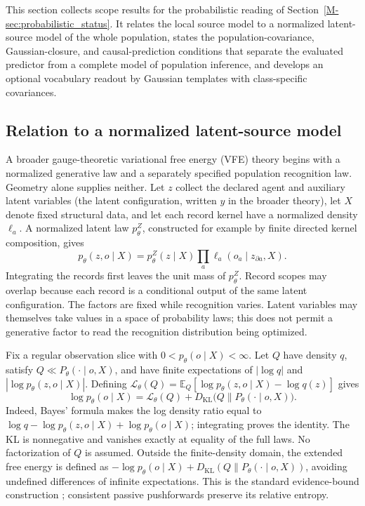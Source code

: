 \documentclass[twoside,11pt]{article}
\begin{document}
This section collects scope results for the probabilistic reading of Section~\ref{M-sec:probabilistic_status}. It relates the local source model to a normalized latent-source model of the whole population, states the population-covariance, Gaussian-closure, and causal-prediction conditions that separate the evaluated predictor from a complete model of population inference, and develops an optional vocabulary readout by Gaussian templates with class-specific covariances.

\subsection{Relation to a normalized latent-source model}
\label{app:fixed_joint_bridge}

A broader gauge-theoretic variational free energy (VFE) theory begins with a normalized generative law and a separately specified population recognition law. Geometry alone supplies neither. Let $z$ collect the declared agent and auxiliary latent variables (the latent configuration, written $y$ in the broader theory), let $X$ denote fixed structural data, and let each record kernel have a normalized density $\ell_a$. A normalized latent law $p_\theta^Z$, constructed for example by finite directed kernel composition, gives
\begin{equation}
p_\theta(z,o\mid X)=p_\theta^Z(z\mid X)\prod_a\ell_a(o_a\mid z_{\partial a},X).
\label{eq:rg_bridge_joint}
\end{equation}
Integrating the records first leaves the unit mass of $p_\theta^Z$. Record scopes may overlap because each record is a conditional output of the same latent configuration. The factors are fixed while recognition varies. Latent variables may themselves take values in a space of probability laws; this does not permit a generative factor to read the recognition distribution being optimized.

Fix a regular observation slice with $0<p_\theta(o\mid X)<\infty$. Let $Q$ have density $q$, satisfy $Q\ll P_\theta(\cdot\mid o,X)$, and have finite expectations of $|\log q|$ and $|\log p_\theta(z,o\mid X)|$. Defining $\mathcal L_\theta(Q)=\mathbb E_Q[\log p_\theta(z,o\mid X)-\log q(z)]$ gives
\begin{equation}
\log p_\theta(o\mid X)=\mathcal L_\theta(Q)+D_{\mathrm{KL}}\bigl(Q\|P_\theta(\cdot\mid o,X)\bigr).
\label{eq:rg_bridge_elbo}
\end{equation}
Indeed, Bayes' formula makes the log density ratio equal to $\log q-\log p_\theta(z,o\mid X)+\log p_\theta(o\mid X)$; integrating proves the identity. The KL is nonnegative and vanishes exactly at equality of the full laws. No factorization of $Q$ is assumed. Outside the finite-density domain, the extended free energy is defined as $-\log p_\theta(o\mid X)+D_{\mathrm{KL}}(Q\|P_\theta(\cdot\mid o,X))$, avoiding undefined differences of infinite expectations. This is the standard evidence-bound construction \citep[arXiv version, Sec.~2.2, Eq.~14]{Blei2017}; consistent passive pushforwards preserve its relative entropy.
\end{document}

